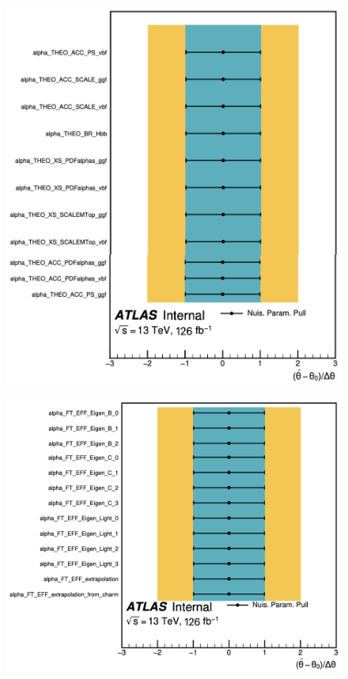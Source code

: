 \begin{figure}
\begin{minipage}{0.48\textwidth}
\\
\vspace{.75em}
\includegraphics[width=.88\textwidth]{figures/my_dihiggs/THEO-bkg-only-pulls}
\end{minipage}
%
\begin{minipage}{0.5\textwidth}
\centering
{} 
\includegraphics[width=.9\textwidth]{figures/my_dihiggs/FTAG-bkg-only-pulls}
\\

\end{minipage}
\end{figure}
